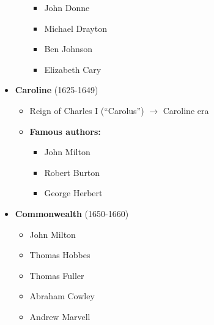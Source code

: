 \documentclass[
  12pt,
    progressbar=frametitle]{beamer}
\providecommand{\tightlist}{%
  \setlength{\itemsep}{0pt}\setlength{\parskip}{0pt}}
\begin{document}
\begin{frame}[allowframebreaks]
\begin{itemize}
\begin{itemize}
    \begin{itemize}
    \tightlist
    \item
      John Donne
    \item
      Michael Drayton
    \item
      Ben Johnson
    \item
      Elizabeth Cary
    \end{itemize}
  \end{itemize}
\item
  \textbf{Caroline} (1625-1649)

  \begin{itemize}
  \tightlist
  \item
    Reign of Charles I (``Carolus'') \(\rightarrow\) Caroline era
  \item
    \textbf{Famous authors:}

    \begin{itemize}
    \tightlist
    \item
      John Milton
    \item
      Robert Burton
    \item
      George Herbert
    \end{itemize}
  \end{itemize}
\item
  \textbf{Commonwealth} (1650-1660)

  \begin{itemize}
  \tightlist
  \item
    John Milton
  \item
    Thomas Hobbes
  \item
    Thomas Fuller
  \item
    Abraham Cowley
  \item
    Andrew Marvell
  \end{itemize}
\end{itemize}
\end{frame}
\end{document}
